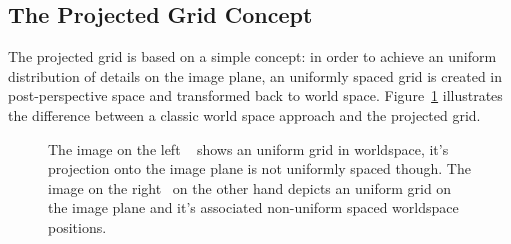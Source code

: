 \subsection{The Projected Grid Concept}
The projected grid is based on a simple concept: in order to achieve an
uniform distribution of details on the image plane, an uniformly spaced grid is
created in post-perspective space and transformed back to world space.
Figure~\ref{fig:projectedgrid} illustrates the difference between a classic
world space approach and the projected grid.
\begin{figure}
\centering
{}
\caption[The Projected Grid Concept]{The image on the left
~ shows an uniform grid in worldspace, it's
projection onto the image plane is not uniformly spaced though. The image on the
right~ on the other hand depicts an uniform grid on
the image plane and it's associated non-uniform spaced worldspace positions.}
\label{fig:projectedgrid}
\end{figure}
